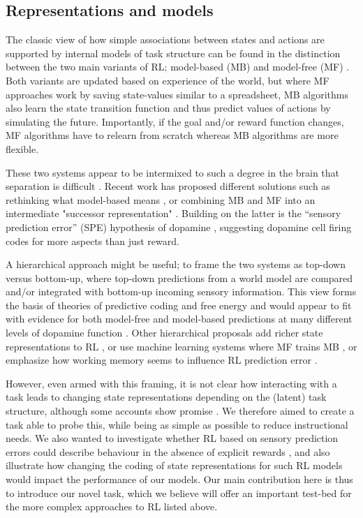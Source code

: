 \documentclass[10pt,letterpaper]{article}
\begin{document}
\subsection{Representations and models}
The classic view of how simple associations between states and actions are supported by internal models of task structure can be found in the distinction between the two main variants of RL; model-based (MB) and model-free (MF) \cite{Daw2005-ti,Doll2012-ou}. Both variants are updated based on experience of the world, but where MF approaches work by saving state-values similar to a spreadsheet, MB algorithms also learn the state transition function and thus predict values of actions by simulating the future. Importantly, if the goal and/or reward function changes, MF algorithms have to relearn from scratch whereas MB algorithms are more flexible.

These two systems appear to be intermixed to such a degree in the brain that separation is difficult \cite{Doll2012-ou,Schultz2016-ul,Simon2011-mg,Tsutsui2016-iq}. Recent work has proposed different solutions such as rethinking what model-based means \cite{Langdon2018-jh}, or combining MB and MF into an intermediate "successor representation" \cite{Momennejad2020-lk}. Building on the latter is the “sensory prediction error” (SPE) hypothesis of dopamine \cite{Gardner2018-vj}, suggesting dopamine cell firing codes for more aspects than just reward.

A hierarchical approach might be useful; to frame the two systems as top-down versus bottom-up, where top-down predictions from a world model are compared and/or integrated with bottom-up incoming sensory information. This view forms the basis of theories of predictive coding \cite{Clark2013-hr} and free energy \cite{Friston2010-wi} and would appear to fit with evidence for both model-free and model-based predictions at many different levels of dopamine function \cite{Doll2012-ou}. Other hierarchical proposals add richer state representations to RL \cite{Langdon2018-jh}, or use machine learning systems where MF trains MB \cite{Botvinick2019-qf}, or emphasize how working memory seems to influence RL prediction error \cite{Collins2018-ga}.

However, even armed with this framing, it is not clear how interacting with a task leads to changing state representations depending on the (latent) task structure, although some accounts show promise \cite{Eckstein2020-yi}. We therefore aimed to create a task able to probe this, while being as simple as possible to reduce instructional needs. We also wanted to investigate whether RL based on sensory prediction errors could describe behaviour in the absence of explicit rewards \cite{Gershman2013-bo,gershman2014statistical}, and also illustrate how changing the coding of state representations for such RL models would impact the performance of our models. Our main contribution here is thus to introduce our novel task, which we believe will offer an important test-bed for the more complex approaches to RL listed above.
\end{document}
